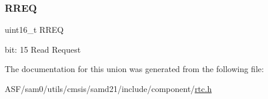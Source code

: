 \subsubsection{\texorpdfstring{RREQ}{RREQ}}
{\footnotesize\ttfamily uint16\+\_\+t R\+R\+EQ}

bit\+: 15 Read Request 

The documentation for this union was generated from the following file\+:\begin{DoxyCompactItemize}
\item 
A\+S\+F/sam0/utils/cmsis/samd21/include/component/\mbox{\hyperlink{component_2rtc_8h}{rtc.\+h}}\end{DoxyCompactItemize}
